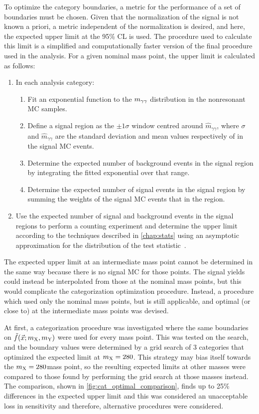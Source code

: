 To optimize the category boundaries, a metric for the performance of a set of boundaries must be chosen. Given that the normalization of the signal is not known a priori, a metric independent of the normalization is desired, and here, the expected upper limit at the 95\% CL is used. The procedure used to calculate this limit is a simplified and computationally faster version of the final procedure used in the analysis. For a given nominal mass point, the upper limit is calculated as follows:
\begin{enumerate}
    \item In each analysis category:
    \begin{enumerate}
        \item Fit an exponential function to the $m_{\gamma\gamma}$ distribution in the nonresonant MC samples.
        \item Define a signal region as the $\pm1\sigma$ window centred around $\hat{m}_{\gamma\gamma}$, where $\sigma$ and $\hat{m}_{\gamma\gamma}$ are the standard deviation and mean values respectively of \mgg in the signal MC events.
        \item Determine the expected number of background events in the signal region by integrating the fitted exponential over that range.
        \item Determine the expected number of signal events in the signal region by summing the weights of the signal MC events that in the region.
    \end{enumerate}
    \item Use the expected number of signal and background events in the signal regions to perform a counting experiment and determine the upper limit according to the techniques described in \cref{chap:stats} using an asymptotic approximation for the distribution of the test statistic~\cite{Cowan:2010js}.
\end{enumerate}
The expected upper limit at an intermediate mass point cannot be determined in the same way because there is no signal MC for those points. The signal yields could instead be interpolated from those at the nominal mass points, but this would complicate the categorization optimization procedure. Instead, a procedure which used only the nominal mass points, but is still applicable, and optimal (or close to) at the intermediate mass points was devised.

At first, a categorization procedure was investigated where the same boundaries on $\tilde{f}(\vec{x}; m_{\mathrm{X}}, m_{\mathrm{Y}})$ were used for every mass point. This was tested on the \XTwoHH search, and the boundary values were determined by a grid search of 3 categories that optimized the expected limit at $m_{\mathrm{X}}=280$\GeV. This strategy may bias itself towards the $m_{\mathrm{X}}=280$\GeV mass point, so the resulting expected limits at other masses were compared to those found by performing the grid search at those masses instead. The comparison, shown in \cref{fig:cat_optimal_comparison}, finds up to 25\% differences in the expected upper limit and this was considered an unacceptable loss in sensitivity and therefore, alternative procedures were considered. 

